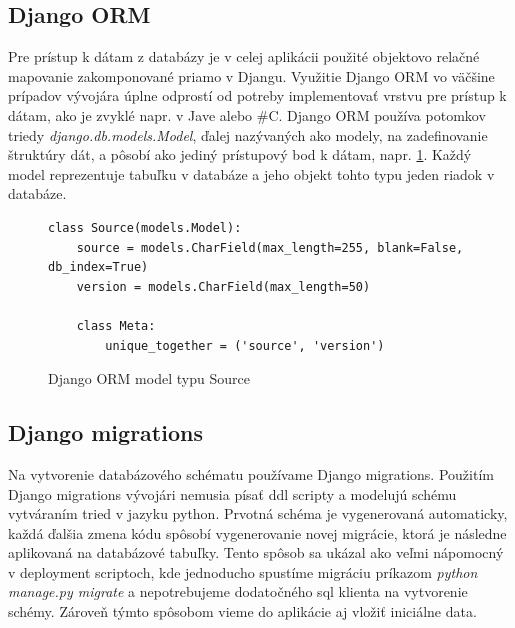 \subsection{Django ORM}
Pre prístup k dátam z databázy je v celej aplikácii použité objektovo relačné mapovanie zakomponované priamo v Djangu. Využitie Django ORM vo väčšine prípadov vývojára úplne odprostí od potreby implementovať vrstvu pre prístup k dátam, ako je zvyklé napr. v Jave alebo \#C. Django ORM používa potomkov triedy \emph{django.db.models.Model}, ďalej nazývaných ako modely, na zadefinovanie štruktúry dát, a pôsobí ako jediný prístupový bod k dátam, napr. \ref{fig:django-model}. Každý model reprezentuje tabuľku v databáze a jeho objekt tohto typu jeden riadok v databáze. 

\begin{figure}[htbp]
\centering
\begin{minipage}{0.9\textwidth}
\lstset{columns=flexible,breaklines=true,breakatwhitespace=true, showstringspaces=false}
\begin{lstlisting}
class Source(models.Model):
    source = models.CharField(max_length=255, blank=False, db_index=True)
    version = models.CharField(max_length=50)

    class Meta:
        unique_together = ('source', 'version')
\end{lstlisting} 		
\end{minipage} 
\caption{Django ORM model typu Source}
\label{fig:django-model}
\end{figure}

\subsection{Django migrations}
Na vytvorenie databázového schématu používame Django migrations. Použitím Django migrations vývojári nemusia písať ddl scripty a modelujú schému vytváraním tried v jazyku python. Prvotná schéma je vygenerovaná automaticky, každá ďalšia zmena kódu spôsobí vygenerovanie novej migrácie, ktorá je následne aplikovaná na databázové tabuľky. Tento spôsob sa ukázal ako veľmi nápomocný v deployment scriptoch, kde jednoducho spustíme migráciu príkazom \emph{python manage.py migrate} a nepotrebujeme dodatočného sql klienta na vytvorenie schémy. Zároveň týmto spôsobom vieme do aplikácie aj vložiť iniciálne data.

